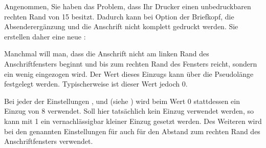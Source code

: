 \begin{Example}
  Angenommen, Sie haben das Problem, dass Ihr Drucker einen unbedruckbaren rechten Rand von
  15 besitzt. Dadurch kann bei Option  der Briefkopf, die
  Absenderergänzung und die Anschrift nicht komplett gedruckt werden. Sie
  erstellen daher eine neue :
%
\end{Example}
%
\EndIndexGroup
\ExampleEndFix


\begin{Declaration}
\end{Declaration}
Manchmal will man, dass die Anschrift nicht am linken Rand des
Anschriftfensters beginnt und bis zum rechten Rand des Fensters reicht,
sondern ein wenig eingezogen wird. Der Wert dieses Einzugs kann über die
Pseudolänge  festgelegt
werden. Typischerweise ist dieser Wert jedoch
0.

Bei jeder der
Einstellungen
,
%
 und
%
 (siehe
) wird beim Wert 0
stattdessen ein Einzug von 8 verwendet. Soll hier tatsächlich kein
Einzug verwendet werden, so kann mit 1 ein vernachlässigbar kleiner
Einzug gesetzt werden. Des Weiteren wird  bei den
genannten Einstellungen für
 auch für den
Abstand zum rechten Rand des Anschriftfensters verwendet.%
\EndIndexGroup


